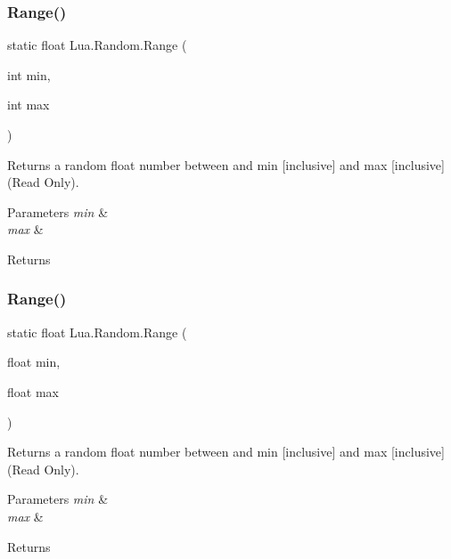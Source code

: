 \subsubsection{\texorpdfstring{Range()}{Range()}\hspace{0.1cm}{\footnotesize\ttfamily [1/2]}}
{\footnotesize\ttfamily static float Lua.\+Random.\+Range (\begin{DoxyParamCaption}\item[{int}]{min,  }\item[{int}]{max }\end{DoxyParamCaption})\hspace{0.3cm}{\ttfamily [static]}}



Returns a random float number between and min \mbox{[}inclusive\mbox{]} and max \mbox{[}inclusive\mbox{]} (Read Only). 


\begin{DoxyParams}{Parameters}
{\em min} & \\
\hline
{\em max} & \\
\hline
\end{DoxyParams}
\begin{DoxyReturn}{Returns}

\end{DoxyReturn}
\mbox{\label{class_lua_1_1_random_a5afbf9cff5e196e2fd7e5ab917b64a8b}} 
\subsubsection{\texorpdfstring{Range()}{Range()}\hspace{0.1cm}{\footnotesize\ttfamily [2/2]}}
{\footnotesize\ttfamily static float Lua.\+Random.\+Range (\begin{DoxyParamCaption}\item[{float}]{min,  }\item[{float}]{max }\end{DoxyParamCaption})\hspace{0.3cm}{\ttfamily [static]}}



Returns a random float number between and min \mbox{[}inclusive\mbox{]} and max \mbox{[}inclusive\mbox{]} (Read Only). 


\begin{DoxyParams}{Parameters}
{\em min} & \\
\hline
{\em max} & \\
\hline
\end{DoxyParams}
\begin{DoxyReturn}{Returns}

\end{DoxyReturn}


